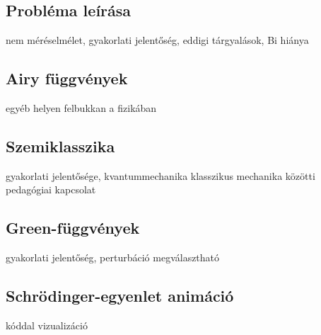 \subsection*{Probléma leírása}
nem méréselmélet, gyakorlati jelentőség, eddigi tárgyalások, Bi hiánya
\subsection*{Airy függvények}
egyéb helyen felbukkan a fizikában
\subsection*{Szemiklasszika}
gyakorlati jelentősége, kvantummechanika klasszikus mechanika közötti pedagógiai kapcsolat
\subsection*{Green-függvények}
gyakorlati jelentőség, perturbáció megválasztható
\subsection*{Schrödinger-egyenlet animáció}
kóddal vizualizáció
